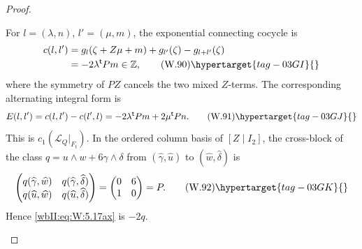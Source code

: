 \begin{proof}
\begin{enumerate}[label=\arabic*.,leftmargin=*]
For \(l=(\lambda,n)\), \(l'=(\mu,m)\), the exponential connecting
cocycle is
\begin{align*}
 c(l,l')
 &=g_l(\zeta+Z\mu+m)+g_{l'}(\zeta)-g_{l+l'}(\zeta)\\
 &=-2\lambda^{\mathsf t}Pm\in\mathbb Z,
\tag{W.90}\hypertarget{tag-03GI}{}\label{wbII:eq:W:5.17aw}
\end{align*}
where the symmetry of \(PZ\) cancels the two mixed \(Z\)-terms.
The corresponding alternating integral form is
\[
 E(l,l')=c(l,l')-c(l',l)
 =-2\lambda^{\mathsf t}Pm+2\mu^{\mathsf t}Pn.
\tag{W.91}\hypertarget{tag-03GJ}{}\label{wbII:eq:W:5.17ax}
\]
This is \(c_1(\mathcal L_Q|_{F_t})\).  In the ordered column basis of
\([Z\mid I_2]\), the cross-block of the class
\(q=u\wedge w+6\gamma\wedge\delta\) from
\((\widehat\gamma,\widehat u)\) to
\((\widehat w,\widehat\delta)\) is
\[
 \begin{pmatrix}
 q(\widehat\gamma,\widehat w)&
 q(\widehat\gamma,\widehat\delta)\\
 q(\widehat u,\widehat w)&
 q(\widehat u,\widehat\delta)
 \end{pmatrix}
 =\begin{pmatrix}0&6\\1&0\end{pmatrix}=P.
\tag{W.92}\hypertarget{tag-03GK}{}\label{wbII:eq:W:5.17ay}
\]
Hence \eqref{wbII:eq:W:5.17ax} is \(-2q\).

\end{enumerate}
\end{proof}
